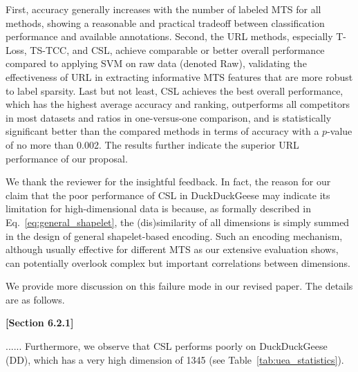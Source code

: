 \begin{sloppypar}
\begin{framed}
First, accuracy generally increases with the number of labeled MTS for all methods, showing a reasonable and practical tradeoff between classification performance and available annotations. Second, the URL methods, especially T-Loss, TS-TCC, and CSL, achieve comparable or better overall performance compared to applying SVM on raw data (denoted Raw), validating the effectiveness of URL in extracting informative MTS features that are more robust to label sparsity. Last but not least, CSL achieves the best overall performance, which has the highest average accuracy and ranking, outperforms all competitors in most datasets and ratios in one-versus-one comparison, and is statistically significant better than the compared methods in terms of accuracy with a $p$-value of no more than 0.002.  The results further indicate the superior URL performance of our proposal. 
\end{framed}


We thank the reviewer for the insightful feedback. In fact, the reason for our claim that the poor performance of CSL in DuckDuckGeese may indicate its limitation for high-dimensional data is because, as formally described in Eq.~\eqref{eq:general_shapelet}, the (dis)similarity of all dimensions is simply summed in the design of general shapelet-based encoding. Such an encoding mechanism, although usually effective for different MTS as our extensive evaluation shows, can potentially overlook complex but important correlations between dimensions.

We provide more discussion on this failure mode in our revised paper. The details are as follows.

\begin{framed}
    \textbf{[Section 6.2.1]}

    ...... Furthermore, we observe that CSL performs poorly on DuckDuckGeese (DD), which has a very high dimension of 1345 (see Table~\ref{tab:uea_statistics}). 
\end{framed}


\end{sloppypar}
